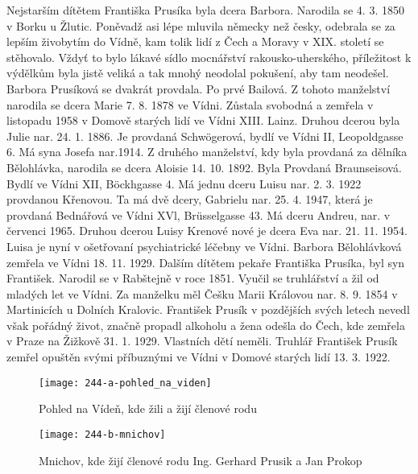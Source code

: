 \documentclass[../dejiny-rodu-prusiku.tex]{subfiles}
\begin{document}
Nejstarším dítětem Františka Prusíka byla dcera Barbora. Narodila se 4. 3. 1850 v Borku u Žlutic. Poněvadž asi lépe mluvila německy než česky, odebrala se za lepším živobytím do Vídně, kam tolik lidí z Čech a Moravy v XIX. století se stěhovalo. Vždyť to bylo lákavé sídlo mocnářství rakousko-uherského, příležitost k výdělkům byla jistě veliká a tak mnohý neodolal pokušení, aby tam neodešel. Barbora Prusíková se dvakrát provdala. Po prvé Bailová. Z tohoto manželství narodila se dcera Marie 7. 8. 1878 ve Vídni. Zůstala svobodná a zemřela v listopadu 1958 v Domově starých lidí ve Vídni XIII. Lainz. Druhou dcerou byla Julie nar. 24. 1. 1886. Je provdaná Schwögerová, bydlí ve Vídni II, Leopoldgasse 6. Má syna Josefa nar.1914. Z druhého manželství, kdy byla provdaná za dělníka Bělohlávka, narodila se dcera Aloisie 14. 10. 1892. Byla Provdaná Braunseisová. Bydlí ve Vídni XII, Böckhgasse 4. Má jednu dceru Luisu nar. 2. 3. 1922 provdanou Křenovou. Ta má dvě dcery, Gabrielu nar. 25. 4. 1947, která je provdaná Bednářová ve Vídni XVl, Brüsselgasse 43. Má dceru Andreu, nar. v červenci 1965. Druhou dcerou Luisy Krenové
nové je dcera Eva nar. 21. 11. 1954. Luisa je nyní v ošetřovaní psychiatrické léčebny ve Vídni. Barbora Bělohlávková zemřela ve Vídni 18. 11. 1929. Dalším dítětem pekaře Františka Prusíka, byl syn František. Narodil se v Rabštejně v roce 1851. Vyučil se truhlářství a žil od mladých let ve Vídni. Za manželku měl Češku Marii Královou nar. 8. 9. 1854 v Martinicích u Dolních Kralovic. František Prusík v pozdějších svých letech nevedl však pořádný život, značně propadl alkoholu a žena odešla do Čech, kde zemřela v Praze na Žižkově 31. 1. 1929. Vlastních dětí neměli. Truhlář František Prusík zemřel opuštěn svými příbuznými ve Vídni v Domové starých lidí 13. 3. 1922.

\begin{figure}
\centering
\texttt{[image: 244-a-pohled\_na\_viden]}
\caption{Pohled na Vídeň, kde žili a žijí členové rodu}
\label{fig:244-a-pohled_na_viden}
\end{figure}

             \begin{figure}
\centering
\texttt{[image: 244-b-mnichov]}
\caption{Mnichov, kde žijí členové rodu Ing. Gerhard Prusik a Jan Prokop}
\label{fig:244-b-mnichov}
\end{figure}
\end{document}

